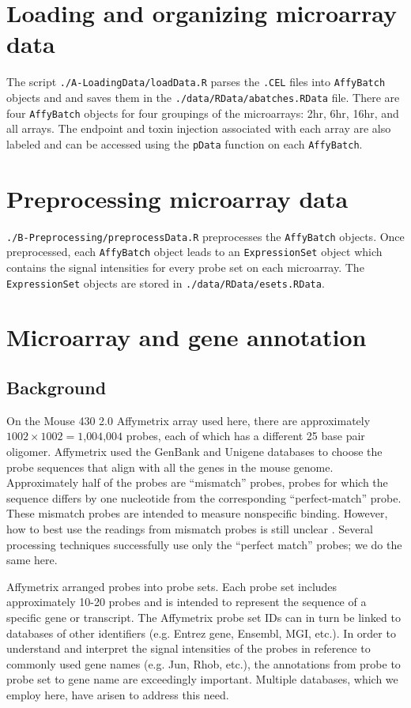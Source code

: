 \section{Loading and organizing microarray data}\label{S:Loading} 
The script \texttt{./A-LoadingData/loadData.R} parses the
\texttt{.CEL} files into \texttt{AffyBatch} objects and
and saves them in the \texttt{./data/RData/abatches.RData} file.
There are four \texttt{AffyBatch} objects for four groupings
of the microarrays: 2hr, 6hr, 16hr, and all arrays.
The endpoint and toxin injection associated with each
array are also labeled and can be accessed using the
\texttt{pData} function on each \texttt{AffyBatch}.

\section{Preprocessing microarray data}\label{S:Preprocessing} 
\texttt{./B-Preprocessing/preprocessData.R} preprocesses
the \texttt{AffyBatch} objects. Once preprocessed, each
\texttt{AffyBatch} object leads to an \texttt{ExpressionSet}
object which contains the signal intensities
for every probe set on each microarray. 
The \texttt{ExpressionSet} objects are stored in
\texttt{./data/RData/esets.RData}.

\section{Microarray and gene annotation}\label{S:Annotations} 

\subsection{Background}

On the Mouse 430 2.0 Affymetrix array used here, there are 
approximately $1002 \times 1002=1$,$004$,$004$ 
probes, each of which has a different 25 base pair oligomer. Affymetrix
used the GenBank and Unigene databases to choose the 
probe sequences that align with all the genes in the 
mouse genome. Approximately half of the probes are ``mismatch'' probes, probes for
which the sequence differs by one nucleotide from the corresponding ``perfect-match'' probe. 
These mismatch probes are intended to measure nonspecific binding. However,
how to best use the readings from mismatch probes is 
still unclear \cite{Wang:2007dy}.
Several processing techniques successfully use only the ``perfect match''
probes; we do the same here.

Affymetrix arranged probes into probe sets. Each probe set includes
approximately 10-20 probes and is intended to represent the sequence
of a specific gene or transcript. The Affymetrix probe set
IDs can in turn be linked to databases of other identifiers
(e\@.g\@. Entrez gene, Ensembl, MGI, etc\@.). In order to 
understand and interpret the signal intensities of the probes
in reference to commonly used gene names (e\@.g\@. Jun, Rhob, 
etc\@.), the annotations from probe to probe set to gene name
are exceedingly important. Multiple databases, which we employ here,
have arisen to address this need.

